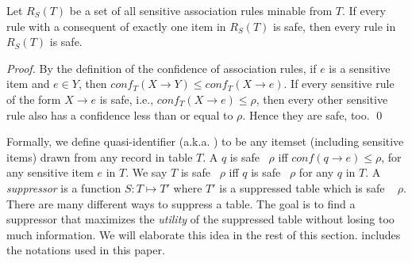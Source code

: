 \begin{lemma}
Let $R_S(T)$ be a set of all sensitive association rules minable from $T$.
If every rule with a consequent of exactly one item in $R_S(T)$ is safe,
then every rule in $R_S(T)$ is safe. 
\end{lemma}
\begin{proof}
By the definition of the confidence of association rules,
if $e$ is a sensitive item and $e \in Y$, then $conf_T(X \rightarrow Y) \le
conf_T(X \rightarrow e)$. If every sensitive rule of the form $X \rightarrow e$ is safe,
i.e., $conf_T(X \rightarrow e) \le \rho$, then every other sensitive rule also has
a confidence less than or equal to $\rho$. Hence they are safe, too.
\qed
\end{proof}


Formally, we define {quasi-identifier} (a.k.a. \qid) to be any itemset
(including sensitive items) drawn from any record in table $T$. A \qid $q$ is safe \wrt~$\rho$ iff $conf(q \rightarrow e)\leq\rho$, for any sensitive item $e$ in $T$.
We say $T$ is safe \wrt~$\rho$ iff $q$ is safe \wrt~$\rho$ for any \qid $q$ in $T$.
A \emph{suppressor} is a function $S : T \mapsto T'$ where $T'$ is a suppressed table which is safe \wrt~ $\rho$.
There are many different ways to suppress a table. The goal
is to find a suppressor that maximizes the {\em utility} of the suppressed
table without losing too much information. We will elaborate this idea
in the rest of this section. 
 includes the
notations used in this paper.

